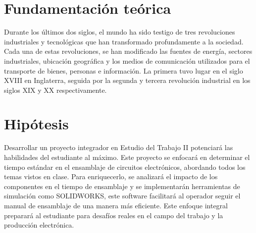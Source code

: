     \section{Fundamentación teórica}
    
    
    Durante los últimos dos siglos, el mundo ha sido testigo de tres revoluciones industriales y tecnológicas que han transformado profundamente a la sociedad. Cada una de estas revoluciones, se han modificado las fuentes de energía, sectores industriales, ubicación geográfica y los medios de comunicación utilizados para el transporte de bienes, personas e información.
    La primera tuvo lugar en el siglo XVIII en Inglaterra, seguida por la segunda y tercera revolución industrial en los siglos XIX y XX respectivamente.
    
    \section{Hipótesis}
    Desarrollar un proyecto integrador en Estudio del Trabajo II potenciará las habilidades del estudiante al máximo. Este proyecto se enfocará en determinar el tiempo estándar en el ensamblaje de circuitos electrónicos, abordando todos los temas vistos en clase. Para enriquecerlo, se analizará el impacto de los componentes en el tiempo de ensamblaje y se implementarán herramientas de simulación como SOLIDWORKS, este software facilitará al operador seguir el manual de ensamblaje de una manera más eficiente.
    Este enfoque integral preparará al estudiante para desafíos reales en el campo del trabajo y la producción electrónica.
